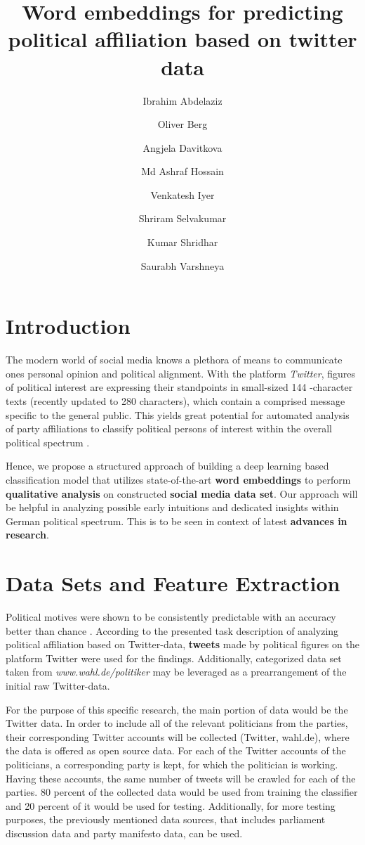 \documentclass[10pt, oneside]{article}
\title{Word embeddings for predicting political affiliation based on twitter data}
\author[]{Ibrahim Abdelaziz}
\author[]{Oliver Berg}
\author[]{Angjela Davitkova}
\author[]{Md Ashraf Hossain}
\author[]{Venkatesh Iyer}
\author[]{Shriram Selvakumar}
\author[]{Kumar Shridhar}
\author[]{Saurabh Varshneya}
\affil[1]{Technische Universität Kaiserslautern}
\begin{document}
\maketitle
\begin{multicols}{2}


\section{Introduction}

The modern world of social media knows a plethora of means to communicate ones personal opinion and political alignment. With the platform \textit{Twitter}, figures of political interest are expressing their standpoints in small-sized 144 -character texts (recently updated to 280 characters), which contain a comprised message specific to the general public. This yields great potential for automated analysis of party affiliations to classify political persons of interest within the overall political spectrum \cite{Biessmann2017}.

Hence, we propose a structured approach of building a deep learning based classification model that utilizes state-of-the-art \textbf{word embeddings} \cite{Pelevinala2016} to perform \textbf{qualitative analysis} on constructed \textbf{social media data set}. Our approach will be helpful in analyzing possible early intuitions and dedicated insights within German political spectrum.
This is to be seen in context of latest \textbf{advances in research}.

\section{Data Sets and Feature Extraction} 

Political motives were shown to be consistently predictable with an accuracy better than chance \cite{Biessmann2017}.
According to the presented task description of analyzing political affiliation based on Twitter-data, \textbf{tweets} made by political figures on the platform Twitter were used for the findings.
Additionally, categorized data set taken from \textit{www.wahl.de/politiker} may be leveraged as a prearrangement of the initial raw Twitter-data.

For the purpose of this specific research, the main portion of data would be the Twitter data. In order to include all of the relevant politicians from the parties, their corresponding Twitter accounts will be collected (Twitter, wahl.de), where the data is offered as open source data.
For each of the Twitter accounts of the politicians, a corresponding party is kept, for which the politician is working. Having these accounts, the same number of tweets will be crawled for each of the parties. 80 percent of the collected data would be used from training the classifier and 20 percent of it would be used for testing.
Additionally, for more testing purposes, the previously mentioned data sources, that includes parliament discussion data and party manifesto data, can be used. 


\end{multicols}
\end{document}
